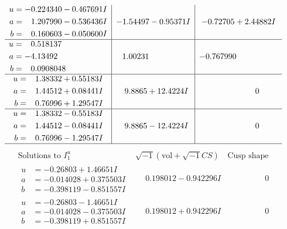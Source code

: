 \documentclass[1p]{elsarticle_modified}
\theoremstyle{definition}
\newcommand{\I}{\sqrt{-1}}
\begin{document}
$$\begin{array}{c|c|c}
\begin{aligned}
u &= -0.224340 - 0.467691 I \\
a &= \phantom{-}1.207990 - 0.536436 I \\
b &= \phantom{-}0.160603 - 0.050600 I\end{aligned}
 & -1.54497 - 0.95371 I & -0.72705 + 2.44882 I \\ \hline\begin{aligned}
u &= \phantom{-}0.518137\phantom{ +0.000000I} \\
a &= -4.13492\phantom{ +0.000000I} \\
b &= \phantom{-}0.0908048\phantom{ +0.000000I}\end{aligned}
 & \phantom{-}1.00231\phantom{ +0.000000I} & -0.767990\phantom{ +0.000000I} \\ \hline\begin{aligned}
u &= \phantom{-}1.38332 + 0.55183 I \\
a &= \phantom{-}1.44512 + 0.08441 I \\
b &= \phantom{-}0.76996 + 1.29547 I\end{aligned}
 & \phantom{-}9.8865 + 12.4224 I & \phantom{-0.000000 } 0 \\ \hline\begin{aligned}
u &= \phantom{-}1.38332 - 0.55183 I \\
a &= \phantom{-}1.44512 - 0.08441 I \\
b &= \phantom{-}0.76996 - 1.29547 I\end{aligned}
 & \phantom{-}9.8865 - 12.4224 I & \phantom{-0.000000 } 0\\
 \hline 
 \end{array}$$\newpage$$\begin{array}{c|c|c}  
\text{Solutions to }I^u_{1}& \I (\text{vol} + \sqrt{-1}CS) & \text{Cusp shape}\\
 \hline 
\begin{aligned}
u &= -0.26803 + 1.46651 I \\
a &= -0.014028 + 0.375503 I \\
b &= -0.398119 - 0.851557 I\end{aligned}
 & \phantom{-}0.198012 - 0.942296 I & \phantom{-0.000000 } 0 \\ \hline\begin{aligned}
u &= -0.26803 - 1.46651 I \\
a &= -0.014028 - 0.375503 I \\
b &= -0.398119 + 0.851557 I\end{aligned}
 & \phantom{-}0.198012 + 0.942296 I & \phantom{-0.000000 } 0 \\ \hline\begin{aligned}

\end{aligned}
\end{array}$$
\end{document}
